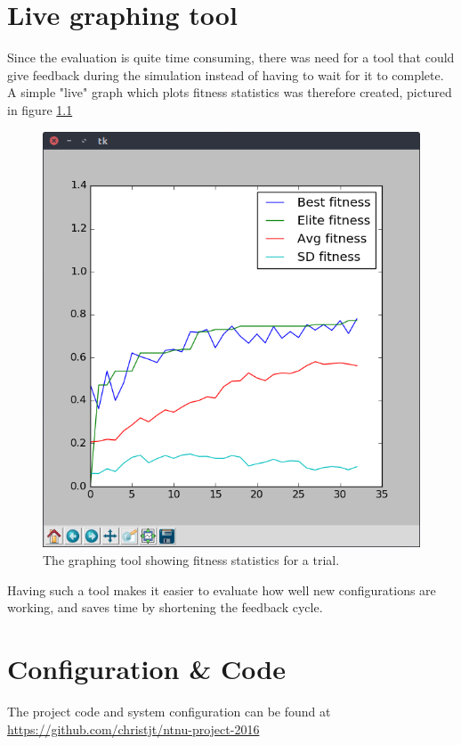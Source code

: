 \chapter{Live graphing tool}
Since the evaluation is quite time consuming, there was need for a tool that could give feedback during the simulation instead of having to wait for it to complete.
A simple "live" graph which plots fitness statistics was therefore created, pictured in figure \ref{fig:live-graph}
\begin{figure}[H]
	\centering
	\includegraphics[scale=0.5]{chapters/res/graph-tool.png}
	\caption{The graphing tool showing fitness statistics for a trial.}
	\label{fig:live-graph}
\end{figure}

Having such a tool makes it easier to evaluate how well new configurations are working, and saves time by shortening the feedback cycle.


\chapter{Configuration \&  Code}

The project code and system configuration can be found at \url{https://github.com/christjt/ntnu-project-2016}




